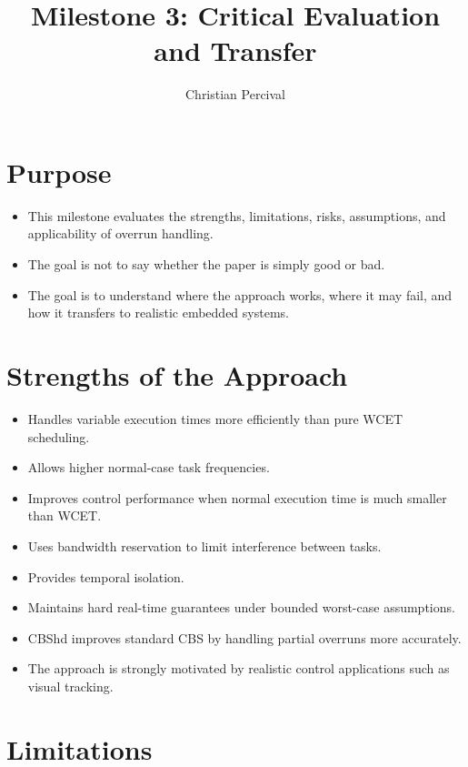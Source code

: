 \documentclass[a4paper,11pt]{article}
\title{Milestone 3: Critical Evaluation and Transfer}
\author{Christian Percival}
\date{}
\begin{document}
\maketitle

\section*{Purpose}

\begin{itemize}
    \item This milestone evaluates the strengths, limitations, risks, assumptions, and applicability of overrun handling.
    \item The goal is not to say whether the paper is simply good or bad.
    \item The goal is to understand where the approach works, where it may fail, and how it transfers to realistic embedded systems.
\end{itemize}

\section*{Strengths of the Approach}

\begin{itemize}
    \item Handles variable execution times more efficiently than pure WCET scheduling.
    \item Allows higher normal-case task frequencies.
    \item Improves control performance when normal execution time is much smaller than WCET.
    \item Uses bandwidth reservation to limit interference between tasks.
    \item Provides temporal isolation.
    \item Maintains hard real-time guarantees under bounded worst-case assumptions.
    \item CBShd improves standard CBS by handling partial overruns more accurately.
    \item The approach is strongly motivated by realistic control applications such as visual tracking.
\end{itemize}

\section*{Limitations}
\end{document}
